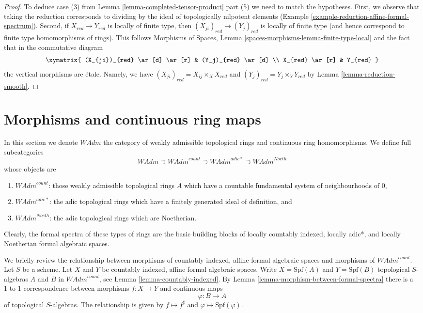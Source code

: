 \begin{proof}
\medskip\noindent
To deduce case (3) from Lemma \ref{lemma-completed-tensor-product} part (5)
we need to match the hypotheses. First, we observe that taking the
reduction corresponds to dividing by the ideal of topologically
nilpotent elements (Example \ref{example-reduction-affine-formal-spectrum}).
Second, if $X_{red} \to Y_{red}$ is locally of finite type, then
$(X_{ji})_{red} \to (Y_j)_{red}$ is locally of finite type
(and hence correspond to finite type homomorphisms of rings).
This follows
Morphisms of Spaces, Lemma \ref{spaces-morphisms-lemma-finite-type-local}
and the fact that in the commutative diagram
$$
\xymatrix{
(X_{ji})_{red} \ar[d] \ar[r] & (Y_j)_{red} \ar[d] \\
X_{red} \ar[r] & Y_{red}
}
$$
the vertical morphisms are \'etale. Namely, we have
$(X_{ji})_{red} = X_{ij} \times_X X_{red}$ and
$(Y_j)_{red} = Y_j \times_Y Y_{red}$
by Lemma \ref{lemma-reduction-smooth}.
\end{proof}









\section{Morphisms and continuous ring maps}
\label{section-morphisms-rings}

\noindent
In this section we denote $\textit{WAdm}$ the category of
weakly admissible topological rings and continuous ring homomorphisms.
We define full subcategories
$$
\textit{WAdm} \supset \textit{WAdm}^{count} \supset
\textit{WAdm}^{adic*} \supset \textit{WAdm}^{Noeth}
$$
whose objects are
\begin{enumerate}
\item $\textit{WAdm}^{count}$: those weakly admissible topological rings
$A$ which have a countable fundamental system of neighbourhoods of $0$,
\item $\textit{WAdm}^{adic*}$: the adic topological rings which have
a finitely generated ideal of definition, and
\item $\textit{WAdm}^{Noeth}$: the adic topological rings which
are Noetherian.
\end{enumerate}
Clearly, the formal spectra of these types of rings are the basic
building blocks of locally countably indexed, locally adic*, and
locally Noetherian formal algebraic spaces.

\medskip\noindent
We briefly review the relationship between morphisms of
countably indexed, affine formal algebraic spaces and
morphisms of $\textit{WAdm}^{count}$.
Let $S$ be a scheme. Let $X$ and $Y$ be countably indexed,
affine formal algebraic spaces. Write $X = \text{Spf}(A)$
and $Y = \text{Spf}(B)$ topological $S$-algebras
$A$ and $B$ in $\textit{WAdm}^{count}$, see
Lemma \ref{lemma-countably-indexed}.
By Lemma \ref{lemma-morphism-between-formal-spectra}
there is a 1-to-1 correspondence between morphisms
$f : X \to Y$ and continuous maps
$$
\varphi : B \longrightarrow A
$$
of topological $S$-algebras. The relationship is given by
$f \mapsto f^\sharp$ and $\varphi \mapsto \text{Spf}(\varphi)$.

